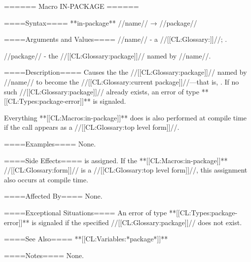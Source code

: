 ====== Macro IN-PACKAGE ======

====Syntax====
**in-package** //name// → //package//

====Arguments and Values====
//name// - a //[[CL:Glossary:\packagenamedesignator]]//; \noeval.

//package// - the //[[CL:Glossary:package]]// named by //name//.

====Description====
Causes the the //[[CL:Glossary:package]]// named by //name// to become the //[[CL:Glossary:current package]]//---that is, . If no such //[[CL:Glossary:package]]// already exists, an error of type **[[CL:Types:package-error]]** is signaled.

Everything **[[CL:Macros:in-package]]** does is also performed at compile time if the call appears as a //[[CL:Glossary:top level form]]//.

====Examples====
None.


====Side Effects====
 is assigned. If the **[[CL:Macros:in-package]]** //[[CL:Glossary:form]]// is a //[[CL:Glossary:top level form]]//, this assignment also occurs at compile time.

====Affected By====
None.

====Exceptional Situations====
An error of type **[[CL:Types:package-error]]** is signaled if the specified //[[CL:Glossary:package]]// does not exist.

====See Also====
**[[CL:Variables:*package*]]**

====Notes====
None.


